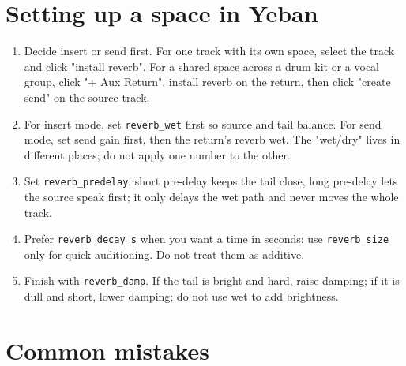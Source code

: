 \section{Setting up a space in Yeban}

\begin{enumerate}
  \item Decide insert or send first. For one track with its own space, select the track and click "install reverb". For a shared space across a drum kit or a vocal group, click "+ Aux Return", install reverb on the return, then click "create send" on the source track.
  \item For insert mode, set \texttt{reverb\_wet} first so source and tail balance. For send mode, set send gain first, then the return's reverb wet. The "wet/dry" lives in different places; do not apply one number to the other.
  \item Set \texttt{reverb\_predelay}: short pre-delay keeps the tail close, long pre-delay lets the source speak first; it only delays the wet path and never moves the whole track.
  \item Prefer \texttt{reverb\_decay\_s} when you want a time in seconds; use \texttt{reverb\_size} only for quick auditioning. Do not treat them as additive.
  \item Finish with \texttt{reverb\_damp}. If the tail is bright and hard, raise damping; if it is dull and short, lower damping; do not use wet to add brightness.
\end{enumerate}



\section{Common mistakes}

